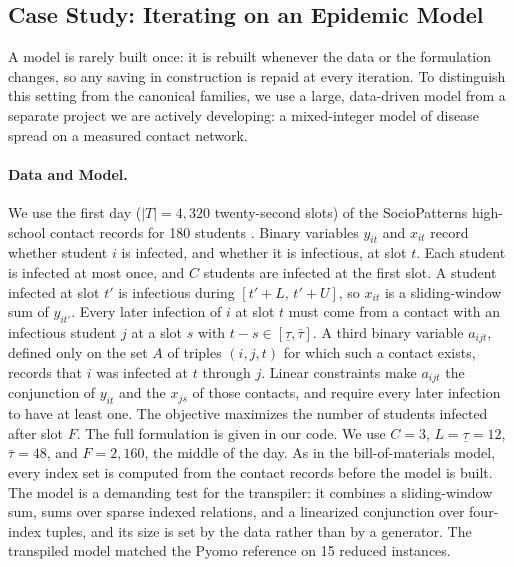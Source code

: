 
\subsection{Case Study: Iterating on an Epidemic Model}
\label{sec:results-epidemic}

A model is rarely built once: it is rebuilt whenever the data or the formulation changes, so any saving in construction is repaid at every iteration. To distinguish this setting from the canonical families, we use a large, data-driven model from a separate project we are actively developing: a mixed-integer model of disease spread on a measured contact network.

\paragraph{Data and Model.} We use the first day ($|T| = 4{,}320$ twenty-second slots) of the SocioPatterns high-school contact records for 180 students \cite{fournet2014contact}. Binary variables $y_{it}$ and $x_{it}$ record whether student $i$ is infected, and whether it is infectious, at slot $t$. Each student is infected at most once, and $C$ students are infected at the first slot. A student infected at slot $t'$ is infectious during $[t'+L,\, t'+U]$, so $x_{it}$ is a sliding-window sum of $y_{it'}$. Every later infection of $i$ at slot $t$ must come from a contact with an infectious student $j$ at a slot $s$ with $t-s \in [\underline{\tau}, \bar{\tau}]$. A third binary variable $a_{ijt}$, defined only on the set $A$ of triples $(i,j,t)$ for which such a contact exists, records that $i$ was infected at $t$ through $j$. Linear constraints make $a_{ijt}$ the conjunction of $y_{it}$ and the $x_{js}$ of those contacts, and require every later infection to have at least one. The objective maximizes the number of students infected after slot $F$. The full formulation is given in our code. We use $C = 3$, $L = \underline{\tau} = 12$, $\bar{\tau} = 48$, and $F = 2{,}160$, the middle of the day. As in the bill-of-materials model, every index set is computed from the contact records before the model is built. The model is a demanding test for the transpiler: it combines a sliding-window sum, sums over sparse indexed relations, and a linearized conjunction over four-index tuples, and its size is set by the data rather than by a generator. The transpiled model matched the Pyomo reference on 15 reduced instances.

